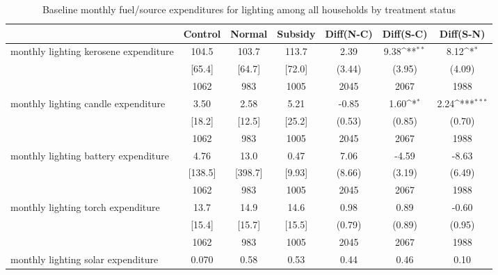 \begin{table}[htbp]\centering
\def\sym#1{\ifmmode^{#1}\else\(^{#1}\)\fi}
\caption{Baseline monthly fuel/source expenditures for lighting among all households by treatment status \label{tab:"balance"}}
\begin{tabular*}{1\hsize}{@{\hskip\tabcolsep\extracolsep\fill}l*{1}{cccccc}}
\toprule
                                &  Control&   Normal&  Subsidy&Diff(N-C)         &Diff(S-C)         &Diff(S-N)         \\
\midrule
monthly lighting kerosene expenditure&    104.5&    103.7&    113.7&     2.39         &     9.38\sym{**} &     8.12\sym{*}  \\
                                &   [65.4]&   [64.7]&   [72.0]&   (3.44)         &   (3.95)         &   (4.09)         \\
                                &     1062&      983&     1005&     2045         &     2067         &     1988         \\
monthly lighting candle expenditure&     3.50&     2.58&     5.21&    -0.85         &     1.60\sym{*}  &     2.24\sym{***}\\
                                &   [18.2]&   [12.5]&   [25.2]&   (0.53)         &   (0.85)         &   (0.70)         \\
                                &     1062&      983&     1005&     2045         &     2067         &     1988         \\
monthly lighting battery expenditure&     4.76&     13.0&     0.47&     7.06         &    -4.59         &    -8.63         \\
                                &  [138.5]&  [398.7]&   [9.93]&   (8.66)         &   (3.19)         &   (6.49)         \\
                                &     1062&      983&     1005&     2045         &     2067         &     1988         \\
monthly lighting torch expenditure&     13.7&     14.9&     14.6&     0.98         &     0.89         &    -0.60         \\
                                &   [15.4]&   [15.7]&   [15.5]&   (0.79)         &   (0.89)         &   (0.95)         \\
                                &     1062&      983&     1005&     2045         &     2067         &     1988         \\
monthly lighting solar expenditure&    0.070&     0.58&     0.53&     0.44         &     0.46         &     0.10         \\

\end{tabular*}
\end{table}
